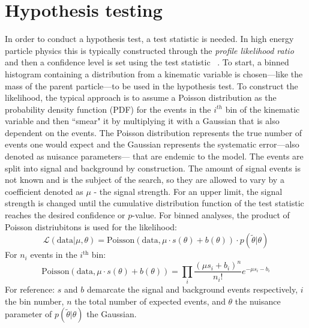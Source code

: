\section{Hypothesis testing}
\label{sec:statinf}
In order to conduct a hypothesis test, a test statistic is needed. In high energy particle physics this is typically constructed through the \textit{profile likelihood ratio} and then a confidence level is set using the test statistic ~\cite{Cowan_2011}.
To start, a binned histogram containing a distribution from a kinematic variable is chosen---like the mass of the parent particle---to be used in the hypothesis test. 
To construct the likelihood, the typical approach is to assume a Poisson distribution as the probability density function (PDF) for the events in the $i^{th}$ bin of the kinematic variable and then ``smear" it by multiplying it with a Gaussian that is also dependent on the events. The Poisson distribution represents the true number of events one would expect and the Gaussian represents the systematic error---also denoted as nuisance parameters--- that are endemic to the model. The events are split into signal and background by construction. The amount of signal events is not known and is the subject of the search, so they are allowed to vary by a coefficient denoted as $\mu$ - the signal strength. 
For an upper limit, the signal strength is changed until the cumulative distribution function of the test statistic reaches the desired confidence or $p$-value. For binned analyses, the product of Poisson distriubitons is used for the likelihood:  
\begin{equation}\mathcal{L}(\text{data}|\mu,\theta) = \text{Poisson}(\text{data},\mu\cdot s(\theta)+b(\theta)) \cdot p(\tilde{\theta}|\theta) \end{equation}
For $n_i$ events in the $i^{\text{th}}$ bin:
\begin{equation}
\text{Poisson}(\text{data},\mu\cdot s(\theta)+b(\theta)) = \prod_i \frac{(\mu s_i+b_i)^n}{n_i !}e^{-\mu s_i -b_i}
\end{equation}
For reference: $s$ and $b$ demarcate the signal and background events respectively, $i$ the bin number, $n$ the total number of expected events, and $\theta$ the nuisance parameter of $p(\tilde{\theta}|\theta)$ the Gaussian.

